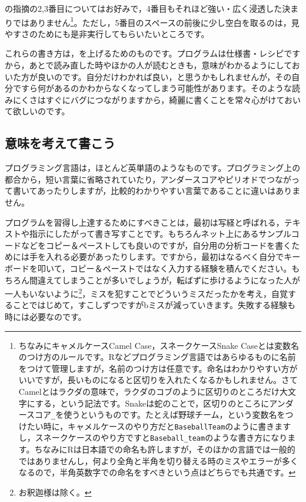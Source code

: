 \documentclass{ltjsbook}
\begin{document}
\citet{Matsuura201610}の指摘の2,3番目についてはお好みで，4番目もそれほど強い・広く浸透した決まりではありません\footnote{ちなみにキャメルケースCamel Case，スネークケースSnake Caseとは変数名のつけ方のルールです。Rなどプログラミング言語ではあらゆるものに名前をつけて管理しますが，名前のつけ方は任意です。命名はわかりやすい方がいいですが，長いものになると区切りを入れたくなるかもしれません。さてCamelとはラクダの意味で，ラクダのコブのように区切りのところだけ大文字にする，という記法です。Snakeは蛇のことで，区切りのところにアンダースコア\verb|_|を使うというものです。たとえば野球チーム，という変数名をつけたい時に，キャメルケースのやり方だと\texttt{BaseballTeam}のように書きますし，スネークケースのやり方ですと\verb|Baseball_team|のような書き方になります。ちなみにRは日本語での命名も許しますが，そのほかの言語では一般的ではありませんし，何より全角と半角を切り替える時のミスやエラーが多くなるので，半角英数字での命名をすべきという点はどちらでも共通です。}。ただし，5番目のスペースの前後に少し空白を取るのは，見やすさのためにも是非実行してもらいたいところです。

これらの書き方は，を上げるためのものです。プログラムは仕様書・レシピですから，あとで読み直した時やほかの人が読むときも，意味がわかるようにしておいた方が良いのです。自分だけわかれば良い，と思うかもしれませんが，その自分ですら何があるのかわからなくなってしまう可能性があります。そのような読みにくさはすぐにバグにつながりますから，綺麗に書くことを常々心がけておいて欲しいのです。

\subsection{意味を考えて書こう}
プログラミング言語は，ほとんど英単語のようなものです。プログラミング上の都合から，短い言葉に省略されていたり，アンダースコアやピリオドでつながって書いてあったりしますが，比較的わかりやすい言葉であることに違いはありません。

プログラムを習得し上達するためにすべきことは，最初は写経と呼ばれる，テキストや指示にしたがって書き写すことです。もちろんネット上にあるサンプルコードなどをコピー＆ペーストしても良いのですが，自分用の分析コードを書くためには手を入れる必要があったりします。ですから，最初はなるべく自分でキーボードを叩いて，コピー＆ペーストではなく入力する経験を積んでください。もちろん間違えてしまうことが多いでしょうが，転ばずに歩けるようになった人が一人もいないように\footnote{お釈迦様は除く。}，ミスを犯すことでどういうミスだったかを考え，自覚することではじめて，すこしずつですがbミスが減っていきます。失敗する経験も時には必要なのです。
\end{document}
